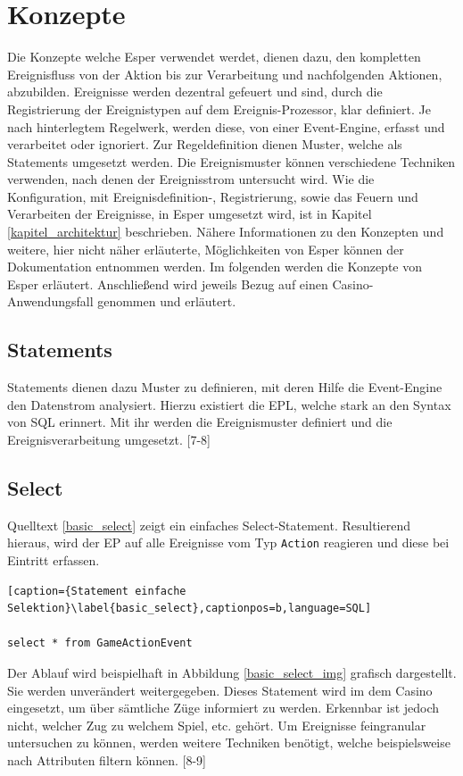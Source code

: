 \chapter{Konzepte}
Die Konzepte welche Esper verwendet werdet, dienen dazu, den kompletten Ereignisfluss von der Aktion bis zur Verarbeitung und nachfolgenden Aktionen, abzubilden.
Ereignisse werden dezentral gefeuert und sind, durch die Registrierung der Ereignistypen auf dem Ereignis-Prozessor, klar definiert. Je nach hinterlegtem Regelwerk, werden diese, von einer Event-Engine, erfasst und verarbeitet oder ignoriert. Zur Regeldefinition dienen Muster, welche als Statements umgesetzt werden. Die Ereignismuster können verschiedene Techniken verwenden, nach denen der Ereignisstrom untersucht wird. 
Wie die Konfiguration, mit Ereignisdefinition-, Registrierung, sowie das Feuern und Verarbeiten der Ereignisse, in Esper umgesetzt wird, ist in Kapitel \ref{kapitel_architektur} beschrieben.
Nähere Informationen zu den Konzepten und weitere, hier nicht näher erläuterte, Möglichkeiten von Esper können der Dokumentation \cite{EsperRef2018} entnommen werden.
Im folgenden werden die Konzepte von Esper erläutert. Anschließend wird jeweils Bezug auf einen Casino-Anwendungsfall genommen und erläutert.


\section{Statements}

Statements dienen dazu Muster zu definieren, mit deren Hilfe die Event-Engine den Datenstrom analysiert. Hierzu existiert die \acf{EPL}, welche stark an den Syntax von SQL erinnert. Mit ihr werden die Ereignismuster definiert und die Ereignisverarbeitung umgesetzt.
\cite{EsperRef2018}[7-8]

\section{Select}

Quelltext \ref{basic_select} zeigt ein einfaches Select-Statement. Resultierend hieraus, wird der \acf{EP} auf alle Ereignisse vom Typ \texttt{Action} reagieren und diese bei Eintritt erfassen. 
\begin{lstlisting}[caption={Statement einfache Selektion}\label{basic_select},captionpos=b,language=SQL]

select * from GameActionEvent

\end{lstlisting}
Der Ablauf wird beispielhaft in Abbildung \ref{basic_select_img} grafisch dargestellt. Sie werden unverändert weitergegeben. Dieses Statement wird im dem Casino eingesetzt, um über sämtliche Züge informiert zu werden. Erkennbar ist jedoch nicht, welcher Zug zu welchem Spiel, etc. gehört. Um Ereignisse feingranular untersuchen zu können, werden weitere Techniken benötigt, welche beispielsweise nach Attributen filtern können.
\cite{EsperRef2018}[8-9]

